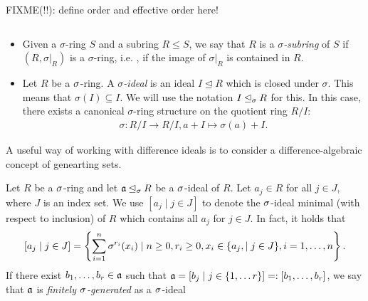 FIXME(!!): define order and effective order here!

\begin{defn} $\phantom{}$
\begin{itemize}
\item Given a $\sigma$-ring $S$ and a subring $R \leq S$, we say that $R$ is a $\sigma$\emph{-subring}  of $S$ if $(R,\sigma|_{R})$ is a $\sigma$-ring,
i.e. , if the image of $\sigma|_{R}$ is contained in $R$.
\item Let $R$ be a $\sigma$-ring. A $\sigma$\emph{-ideal}  is an ideal $I \unlhd R$ which is closed under $\sigma$. This means that $\sigma(I) \subseteq I$. We will use the notation $I \unlhd_{\sigma} R$ for this. In this case, there exists a canonical $\sigma$-ring structure on the quotient ring $R/I$:
\begin{align*} \sigma: R/I \rightarrow R/I, a + I \mapsto \sigma(a) + I. \end{align*}
\end{itemize}
\end{defn}

A useful way of working with difference ideals is to consider a difference-algebraic concept of genearting sets.

\begin{defn}
Let $R$ be a $\sigma$-ring and let  $\mathfrak{a} \unlhd_{\sigma} R$ be a $\sigma$-ideal of $R$. Let $a_j \in R$ for all $ j \in J$, where $J$ is an index set. We use $[a_j \mid j \in J]$ to denote the $\sigma$-ideal minimal (with respect to inclusion) of $R$ which contains all $a_j$ for $j \in J$. In fact, it holds that \[[a_j \mid j \in J] = \left\{ \sum_{i=1}^n \sigma^{r_i}(x_i) \mid n \geq 0, r_i \geq 0, x_i \in \{a_j, \mid j \in J \}, i=1,\ldots,n \right\}. \] 
If there exist $b_1,\ldots,b_r \in \mathfrak{a}$ such that $\mathfrak{a} = [b_j \mid j \in \{1,\ldots r \}] =: [b_1,\ldots,b_r]$,
 we say that $\mathfrak{a}$ is \emph{finitely $\sigma$-generated} as a $\sigma$-ideal 
\end{defn}

